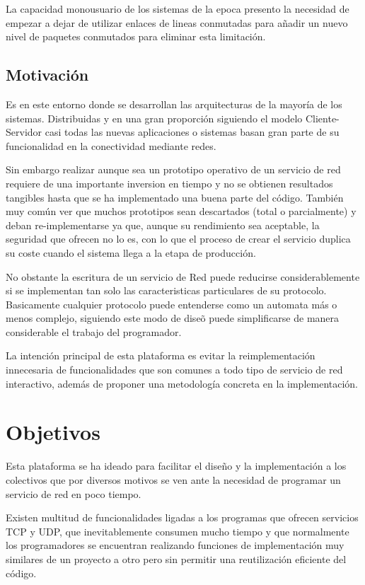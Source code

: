 \documentclass[a4paper,spanish,12pt]{book}
\begin{document}
La capacidad monousuario de los sistemas de la epoca presento la necesidad de empezar a dejar de utilizar enlaces de lineas conmutadas para añadir un nuevo nivel de paquetes conmutados para eliminar esta limitación.

\section{Motivación}

Es en este entorno donde se desarrollan las arquitecturas de la mayor\'ia de los sistemas. Distribuidas y en una gran proporci\'on siguiendo el modelo Cliente-Servidor casi todas las nuevas aplicaciones o sistemas basan gran parte de su funcionalidad en la conectividad mediante redes. 

Sin embargo realizar aunque sea un prototipo operativo de un servicio de red requiere de una importante inversion en tiempo y no se obtienen resultados tangibles hasta que se ha implementado una buena parte del código.
Tambi\'en muy com\'un ver que muchos prototipos sean descartados (total o parcialmente) y deban re-implementarse ya que, aunque su rendimiento sea aceptable, la seguridad que ofrecen no lo es, con lo que el proceso de crear el servicio duplica su coste cuando el sistema llega a la etapa de producci\'on.

No obstante la escritura de un servicio de Red puede reducirse considerablemente si se implementan tan solo las caracteristicas particulares de su protocolo. Basicamente cualquier protocolo puede entenderse como un automata m\'as o menos complejo, siguiendo este modo de dise\~{o} puede simplificarse de manera considerable el trabajo del programador.

La intención principal de esta plataforma es evitar la reimplementación innecesaria de funcionalidades que son comunes a todo tipo de servicio de red interactivo, además de proponer una metodología concreta en la implementación.

\chapter{Objetivos}

Esta plataforma se ha ideado para facilitar el diseño y la implementación a los colectivos que por diversos motivos se ven ante la necesidad de programar un servicio de red en poco tiempo. 

Existen multitud de funcionalidades ligadas a los programas que ofrecen servicios TCP y UDP, que inevitablemente consumen mucho tiempo y que normalmente los programadores se encuentran realizando funciones de implementación muy similares de un proyecto a otro pero sin permitir una reutilización eficiente del código.
\end{document}
